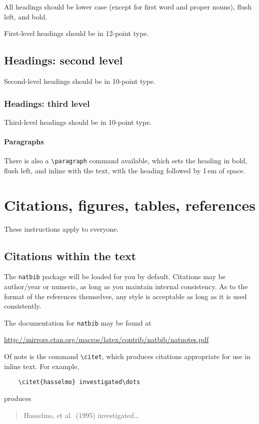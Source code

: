 \documentclass{article}
\begin{document}
	All headings should be lower case (except for first word and proper nouns),
	flush left, and bold.
	
	First-level headings should be in 12-point type.
	
	\subsection{Headings: second level}
	
	Second-level headings should be in 10-point type.
	
	\subsubsection{Headings: third level}
	
	Third-level headings should be in 10-point type.
	
	\paragraph{Paragraphs}
	
	There is also a \verb+\paragraph+ command available, which sets the heading in
	bold, flush left, and inline with the text, with the heading followed by 1\,em
	of space.
	
	\section{Citations, figures, tables, references}
	\label{others}
	
	These instructions apply to everyone.
	
	\subsection{Citations within the text}
	
	The \verb+natbib+ package will be loaded for you by default.  Citations may be
	author/year or numeric, as long as you maintain internal consistency.  As to the
	format of the references themselves, any style is acceptable as long as it is
	used consistently.
	
	The documentation for \verb+natbib+ may be found at
	\begin{center}
		\url{http://mirrors.ctan.org/macros/latex/contrib/natbib/natnotes.pdf}
	\end{center}
	Of note is the command \verb+\citet+, which produces citations appropriate for
	use in inline text.  For example,
	\begin{verbatim}
	\citet{hasselmo} investigated\dots
	\end{verbatim}
	produces
	\begin{quote}
		Hasselmo, et al.\ (1995) investigated\dots
	\end{quote}
	
\end{document}

